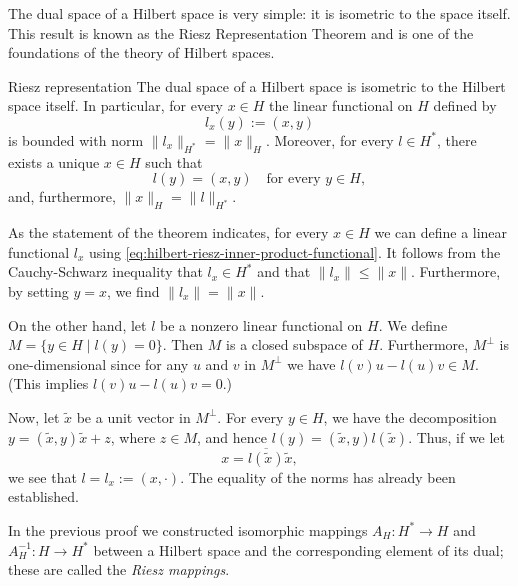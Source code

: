 The dual space of a Hilbert space is very simple: it is isometric to the space itself. This result is known as the Riesz Representation Theorem and is one of the foundations of the theory of Hilbert spaces.

\begin{Theorem}{Riesz representation}
\label{thm:hilbert-riesz-representation}
The dual space of a Hilbert space is isometric to the Hilbert space itself. In particular, for every $x\in H$ the linear functional on $H$ defined by
\begin{equation}\label{eq:hilbert-riesz-inner-product-functional}
l_x(y):=(x,y)
\end{equation}
is bounded with norm $\|l_x\|_{H^*}=\|x\|_H$. Moreover, for every $l\in H^*$, there exists a unique $x\in H$ such that
\begin{equation}\label{eq:hilbert-riesz-functional-representation}
l(y)=(x,y)\quad\text{for every }y\in H,
\end{equation}
and, furthermore, $\|x\|_H=\|l\|_{H^*}$.
\end{Theorem}

\begin{Proof}
As the statement of the theorem indicates, for every $x\in H$ we can define a linear functional $l_x$ using \eqref{eq:hilbert-riesz-inner-product-functional}. It follows from the Cauchy-Schwarz inequality that $l_x\in H^*$ and that $\|l_x\|\leq\|x\|$. Furthermore, by setting $y=x$, we find $\|l_x\|=\|x\|$.

On the other hand, let $l$ be a nonzero linear functional on $H$. We define $M=\{y\in H\mid l(y)=0\}$. Then $M$ is a closed subspace of $H$. Furthermore, $M^\perp$ is one-dimensional since for any $u$ and $v$ in $M^\perp$ we have $l(v)u-l(u)v\in M$. (This implies $l(v)u-l(u)v=0$.)

Now, let $\widetilde x$ be a unit vector in $M^\perp$. For every $y\in H$, we have the decomposition $y=(\widetilde x,y)\widetilde x+z$, where $z\in M$, and hence $l(y)=(\widetilde x,y)l(\widetilde x)$. Thus, if we let
\begin{equation}\label{eq:riesz-representing-vector-from-kernel-complement}
x=\overline{l(\widetilde x)}\widetilde x,
\end{equation}
we see that $l=l_x:=(x,\cdot)$. The equality of the norms has already been established.
\end{Proof}

\begin{Remark}
\label{rem:riesz-mappings}
In the previous proof we constructed isomorphic mappings $A_H:H^*\to H$ and $A_H^{-1}:H\to H^*$ between a Hilbert space and the corresponding element of its dual; these are called the \emph{Riesz mappings}.
\end{Remark}

